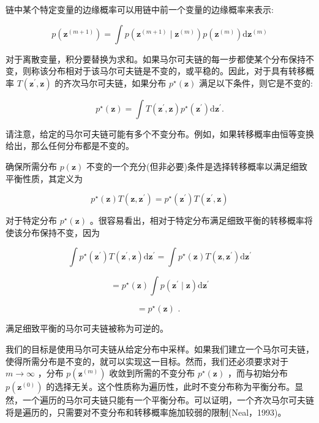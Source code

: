 \documentclass[10pt]{article}
\begin{document}
链中某个特定变量的边缘概率可以用链中前一个变量的边缘概率来表示:

\[
p\left( {\mathbf{z}}^{\left( m + 1\right) }\right)  = \int p\left( {{\mathbf{z}}^{\left( m + 1\right) } \mid  {\mathbf{z}}^{\left( m\right) }}\right) p\left( {\mathbf{z}}^{\left( m\right) }\right) \mathrm{d}{\mathbf{z}}^{\left( m\right) } \tag{14.32}
\]

对于离散变量，积分要替换为求和。如果马尔可夫链的每一步都使某个分布保持不变，则称该分布相对于该马尔可夫链是不变的，或平稳的。因此，对于具有转移概率 \(T\left( {{\mathbf{z}}^{\prime },\mathbf{z}}\right)\) 的齐次马尔可夫链，如果分布 \({p}^{ \star  }\left( \mathbf{z}\right)\) 满足以下条件，则它是不变的:

\[
{p}^{ \star  }\left( \mathbf{z}\right)  = \int T\left( {{\mathbf{z}}^{\prime },\mathbf{z}}\right) {p}^{ \star  }\left( {\mathbf{z}}^{\prime }\right) \mathrm{d}{\mathbf{z}}^{\prime }. \tag{14.33}
\]

请注意，给定的马尔可夫链可能有多个不变分布。例如，如果转移概率由恒等变换给出，那么任何分布都是不变的。

确保所需分布 \(p\left( \mathbf{z}\right)\) 不变的一个充分(但非必要)条件是选择转移概率以满足细致平衡性质，其定义为

\[
{p}^{ \star  }\left( \mathbf{z}\right) T\left( {\mathbf{z},{\mathbf{z}}^{\prime }}\right)  = {p}^{ \star  }\left( {\mathbf{z}}^{\prime }\right) T\left( {{\mathbf{z}}^{\prime },\mathbf{z}}\right)  \tag{14.34}
\]

对于特定分布 \({p}^{ \star  }\left( \mathbf{z}\right)\) 。很容易看出，相对于特定分布满足细致平衡的转移概率将使该分布保持不变，因为

\[
\int {p}^{ \star  }\left( {\mathbf{z}}^{\prime }\right) T\left( {{\mathbf{z}}^{\prime },\mathbf{z}}\right) \mathrm{d}{\mathbf{z}}^{\prime } = \int {p}^{ \star  }\left( \mathbf{z}\right) T\left( {\mathbf{z},{\mathbf{z}}^{\prime }}\right) \mathrm{d}{\mathbf{z}}^{\prime } \tag{14.35}
\]

\[
= {p}^{ \star  }\left( \mathbf{z}\right) \int p\left( {{\mathbf{z}}^{\prime } \mid  \mathbf{z}}\right) \mathrm{d}{\mathbf{z}}^{\prime } \tag{14.36}
\]

\[
= {p}^{ \star  }\left( \mathbf{z}\right) \text{ . } \tag{14.37}
\]

满足细致平衡的马尔可夫链被称为可逆的。

我们的目标是使用马尔可夫链从给定分布中采样。如果我们建立一个马尔可夫链，使得所需分布是不变的，就可以实现这一目标。然而，我们还必须要求对于 \(m \rightarrow  \infty\) ，分布 \(p\left( {\mathbf{z}}^{\left( m\right) }\right)\) 收敛到所需的不变分布 \({p}^{ \star  }\left( \mathbf{z}\right)\) ，而与初始分布 \(p\left( {\mathbf{z}}^{\left( 0\right) }\right)\) 的选择无关。这个性质称为遍历性，此时不变分布称为平衡分布。显然，一个遍历的马尔可夫链只能有一个平衡分布。可以证明，一个齐次马尔可夫链将是遍历的，只需要对不变分布和转移概率施加较弱的限制(Neal，1993)。
\end{document}
